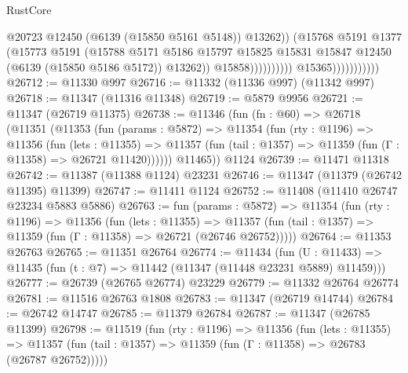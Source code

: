 \begin{lexlean}{RustCore}
\begin{coremodule}
                                                @20723
                                                @12450
                                                (@6139 (@15850 @5161 @5148))
                                                @13262))
                                            (@15768
                                              @5191
                                              @1377
                                              (@15773
                                                @5191
                                                (@15788
                                                  @5171
                                                  @5186
                                                  @15797
                                                  @15825
                                                  @15831
                                                  @15847
                                                  @12450
                                                  (@6139 (@15850 @5186 @5172))
                                                  @13262))
                                              @15858))))))))))
                          @15365)))))))))))
@26712 := @11330 @997
@26716 := @11332 (@11336 @997) (@11342 @997)
@26718 := @11347 (@11316 @11348)
@26719 := @5879 @9956
@26721 := @11347 (@26719 @11375)
@26738 := @11346
    (fun (fn : @60) =>
    @26718
      (@11351
        (@11353
          (fun (params : @5872) =>
          @11354
            (fun (rty : @1196) =>
            @11356
              (fun (lets : @11355) =>
              @11357 (fun (tail : @1357) => @11359 (fun (Γ : @11358) => @26721 @11420))))))
        @11465))
    @1124
@26739 := @11471 @11318
@26742 := @11387 (@11388 @1124) @23231
@26746 := @11347 (@11379 (@26742 @11395) @11399)
@26747 := @11411 @1124
@26752 := @11408 (@11410 @26747 @23234 @5883 @5886)
@26763 := fun (params : @5872) =>
  @11354
    (fun (rty : @1196) =>
    @11356
      (fun (lets : @11355) =>
      @11357 (fun (tail : @1357) => @11359 (fun (Γ : @11358) => @26721 (@26746 @26752)))))
@26764 := @11353 @26763
@26765 := @11351 @26764
@26774 := @11434
    (fun (U : @11433) => @11435 (fun (t : @7) => @11442 (@11347 (@11448 @23231 @5889) @11459)))
@26777 := @26739 (@26765 @26774) @23229
@26779 := @11332 @26764 @26774
@26781 := @11516 @26763 @1808
@26783 := @11347 (@26719 @14744)
@26784 := @26742 @14747
@26785 := @11379 @26784
@26787 := @11347 (@26785 @11399)
@26798 := @11519
    (fun (rty : @1196) =>
    @11356
      (fun (lets : @11355) =>
      @11357 (fun (tail : @1357) => @11359 (fun (Γ : @11358) => @26783 (@26787 @26752)))))

\end{coremodule}
\end{lexlean}
